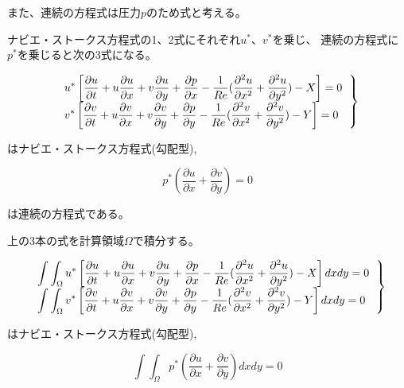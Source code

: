 \documentclass{jarticle}
\begin{document}
また、連続の方程式は圧力$p$のため式と考える。

ナビエ・ストークス方程式の1、2式にそれぞれ$u^*$、$v^*$を乗じ、
連続の方程式に$p^*$を乗じると次の3式になる。


\begin{equation}
\left.
\begin{tabular}{l}
$\displaystyle
u^*\left[\frac{\partial u}{\partial t}+u\frac{\partial u}{\partial x}+v\frac{\partial u}{\partial y}+\frac{\partial p}{\partial x}-\frac{1}{Re}(\frac{\partial^2 u}{\partial x^2}+\frac{\partial^2 u}{\partial y^2})-X\right]=0$\\
$\displaystyle  
v^*\left[\frac{\partial v}{\partial t}+u\frac{\partial v}{\partial x}+v\frac{\partial v}{\partial y}+\frac{\partial p}{\partial y}-\frac{1}{Re}(\frac{\partial^2 v}{\partial x^2}+\frac{\partial^2 v}{\partial y^2})-Y\right]=0$
\end{tabular}
\right\}
\end{equation}

\theequation はナビエ・ストークス方程式(勾配型),

\begin{equation}
\displaystyle
p^*\left(\frac{\partial u}{\partial x}+\frac{\partial v}{\partial y}\right) = 0
\end{equation}

\theequation は連続の方程式である。


上の3本の式を計算領域$\Omega$で積分する。



\begin{equation}
\left.
\begin{tabular}{l}
$\displaystyle
\int\int_\Omega u^*\left[\frac{\partial u}{\partial t}+u\frac{\partial u}{\partial x}+v\frac{\partial u}{\partial y}+\frac{\partial p}{\partial x}-\frac{1}{Re}(\frac{\partial^2 u}{\partial x^2}+\frac{\partial^2 u}{\partial y^2})-X\right]dxdy=0$\\
$\displaystyle  
\int\int_\Omega v^*\left[\frac{\partial v}{\partial t}+u\frac{\partial v}{\partial x}+v\frac{\partial v}{\partial y}+\frac{\partial p}{\partial y}-\frac{1}{Re}(\frac{\partial^2 v}{\partial x^2}+\frac{\partial^2 v}{\partial y^2})-Y\right]dxdy=0$
\end{tabular}
\right\}
\end{equation}

\theequation はナビエ・ストークス方程式(勾配型),

\begin{equation}
\displaystyle
\int\int_\Omega p^*\left(\frac{\partial u}{\partial x}+\frac{\partial v}{\partial y}\right)dxdy = 0
\end{equation}
\end{document}
